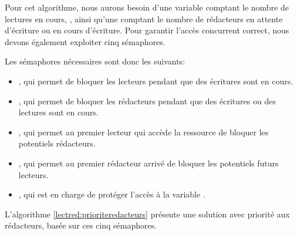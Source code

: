 Pour cet algorithme, nous aurons besoin d'une variable comptant le nombre de lectures en cours, , ainsi qu'une comptant le nombre de rédacteurs en attente d'écriture ou en cours d'écriture. Pour garantir l'accès concurrent correct, nous devons également exploiter cinq sémaphores.

Les sémaphores nécessaires sont donc les suivants:
\begin{itemize}
\item {}, qui permet de bloquer les lecteurs pendant que des écritures sont en cours.
\item {}, qui permet de bloquer les rédacteurs pendant que des écritures ou des lectures sont en cours.
\item {}, qui permet au premier lecteur qui accède la ressource de bloquer les potentiels rédacteurs.
\item {}, qui permet au premier rédacteur arrivé de bloquer les potentiels futurs lecteurs.
\item {}, qui est en charge de protéger l'accès à la variable .
\end{itemize}

L'algorithme \ref{lectred:prioriteredacteurs} présente une solution avec priorité aux rédacteurs, basée sur ces cinq sémaphores.


